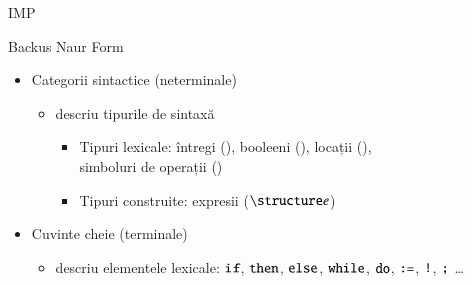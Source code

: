 \documentclass[xcolor=pdftex,romanian,colorlinks]{beamer}
\begin{document}
\begin{section}{IMP}
\begin{frame}{Backus Naur Form}
\begin{itemize}
\alert{\renewcommand{\syntaxKeyword}{}\syntax[\Exp]{\color{black}\Sif\;\Exp\Sthen\Exp\Selse\Exp}{}
	\syntaxCont[\Stmt]{\color{black}\Loc \terminal{:=}\Exp}{}}
   \item Categorii sintactice (neterminale) 
   \begin{itemize}
    \item descriu tipurile de sintaxă
     \begin{itemize}
      \item Tipuri lexicale: 
		întregi (), booleeni (), locații (),\\
		simboluri de operații ()
	  \item Tipuri construite: expresii ($\Exp$)
     \end{itemize}
   \end{itemize}
   \item Cuvinte cheie (terminale)
   \begin{itemize}
    \item descriu elementele lexicale: 
   $\mathrel{\text{\ttfamily if}}$, $\mathrel{\text{\ttfamily then}}$, $\mathrel{\text{\ttfamily else}}$,  
   $\mathrel{\text{\ttfamily while}}$, $\mathrel{\text{\ttfamily do}}$,
   $\mathrel{\text{\ttfamily :=}}$, $\mathrel{\text{\ttfamily !}}$, $\mathrel{\text{\ttfamily ;}}$ \ldots
   \end{itemize}
  \end{itemize}
 \end{frame}


\end{section}
\end{document}
